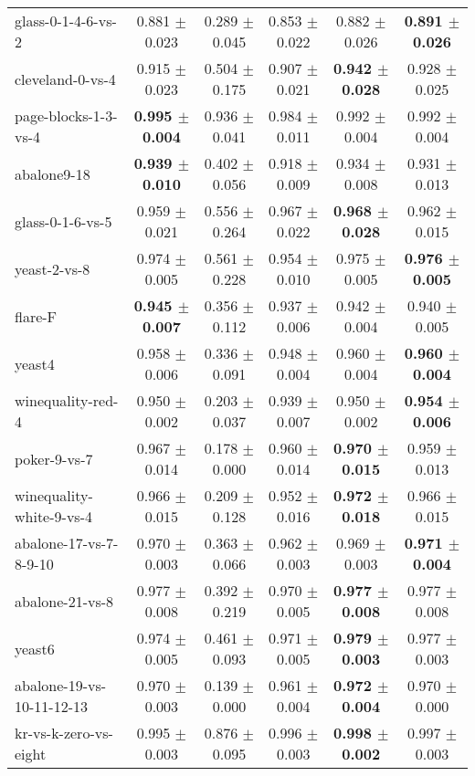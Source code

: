 \begin{table}[!ht]
{\begin{tabular}{l c c c c c}
glass-0-1-4-6-vs-2 & 0.881 $\pm$ 0.023 & 0.289 $\pm$ 0.045 & 0.853 $\pm$ 0.022 & 0.882 $\pm$ 0.026 & \textbf{0.891 $\pm$ 0.026} \\
cleveland-0-vs-4 & 0.915 $\pm$ 0.023 & 0.504 $\pm$ 0.175 & 0.907 $\pm$ 0.021 & \textbf{0.942 $\pm$ 0.028} & 0.928 $\pm$ 0.025 \\
page-blocks-1-3-vs-4 & \textbf{0.995 $\pm$ 0.004} & 0.936 $\pm$ 0.041 & 0.984 $\pm$ 0.011 & 0.992 $\pm$ 0.004 & 0.992 $\pm$ 0.004 \\
abalone9-18 & \textbf{0.939 $\pm$ 0.010} & 0.402 $\pm$ 0.056 & 0.918 $\pm$ 0.009 & 0.934 $\pm$ 0.008 & 0.931 $\pm$ 0.013 \\
glass-0-1-6-vs-5 & 0.959 $\pm$ 0.021 & 0.556 $\pm$ 0.264 & 0.967 $\pm$ 0.022 & \textbf{0.968 $\pm$ 0.028} & 0.962 $\pm$ 0.015 \\
yeast-2-vs-8 & 0.974 $\pm$ 0.005 & 0.561 $\pm$ 0.228 & 0.954 $\pm$ 0.010 & 0.975 $\pm$ 0.005 & \textbf{0.976 $\pm$ 0.005} \\
flare-F & \textbf{0.945 $\pm$ 0.007} & 0.356 $\pm$ 0.112 & 0.937 $\pm$ 0.006 & 0.942 $\pm$ 0.004 & 0.940 $\pm$ 0.005 \\
yeast4 & 0.958 $\pm$ 0.006 & 0.336 $\pm$ 0.091 & 0.948 $\pm$ 0.004 & 0.960 $\pm$ 0.004 & \textbf{0.960 $\pm$ 0.004} \\
winequality-red-4 & 0.950 $\pm$ 0.002 & 0.203 $\pm$ 0.037 & 0.939 $\pm$ 0.007 & 0.950 $\pm$ 0.002 & \textbf{0.954 $\pm$ 0.006} \\
poker-9-vs-7 & 0.967 $\pm$ 0.014 & 0.178 $\pm$ 0.000 & 0.960 $\pm$ 0.014 & \textbf{0.970 $\pm$ 0.015} & 0.959 $\pm$ 0.013 \\
winequality-white-9-vs-4 & 0.966 $\pm$ 0.015 & 0.209 $\pm$ 0.128 & 0.952 $\pm$ 0.016 & \textbf{0.972 $\pm$ 0.018} & 0.966 $\pm$ 0.015 \\
abalone-17-vs-7-8-9-10 & 0.970 $\pm$ 0.003 & 0.363 $\pm$ 0.066 & 0.962 $\pm$ 0.003 & 0.969 $\pm$ 0.003 & \textbf{0.971 $\pm$ 0.004} \\
abalone-21-vs-8 & 0.977 $\pm$ 0.008 & 0.392 $\pm$ 0.219 & 0.970 $\pm$ 0.005 & \textbf{0.977 $\pm$ 0.008} & 0.977 $\pm$ 0.008 \\
yeast6 & 0.974 $\pm$ 0.005 & 0.461 $\pm$ 0.093 & 0.971 $\pm$ 0.005 & \textbf{0.979 $\pm$ 0.003} & 0.977 $\pm$ 0.003 \\
abalone-19-vs-10-11-12-13 & 0.970 $\pm$ 0.003 & 0.139 $\pm$ 0.000 & 0.961 $\pm$ 0.004 & \textbf{0.972 $\pm$ 0.004} & 0.970 $\pm$ 0.000 \\
kr-vs-k-zero-vs-eight & 0.995 $\pm$ 0.003 & 0.876 $\pm$ 0.095 & 0.996 $\pm$ 0.003 & \textbf{0.998 $\pm$ 0.002} & 0.997 $\pm$ 0.003 \\

\end{tabular}}
\end{table}
